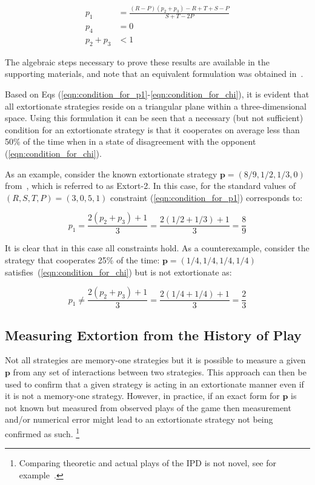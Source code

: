 \documentclass[10pt,letterpaper]{article}
\begin{document}
\begin{align}
    p_1 & = \frac{(R-P)(p_2 + p_3) - R + T + S - P}{S + T - 2P}
     \label{eqn:condition_for_p1}\\
    p_4 & = 0 \label{eqn:condition_for_p4}\\
    p_2 + p_3 & < 1\label{eqn:condition_for_chi}
\end{align}

The algebraic steps necessary to prove these results are available in the
supporting materials, and note that an equivalent formulation was obtained
in~\cite{adami2013evolutionary}.

Based on Eqs (\ref{eqn:condition_for_p1}-\ref{eqn:condition_for_chi}), 
it is evident that all extortionate strategies
reside on a triangular plane within a three-dimensional space.
Using this formulation it can be seen that a necessary (but not sufficient)
condition for an extortionate strategy is that it cooperates on average less
than 50\% of the time when in a state of disagreement with the opponent
(\ref{eqn:condition_for_chi}).

As an example, consider the known extortionate strategy \(\textbf{p}=(8 / 9, 1 / 2, 1 /
3, 0)\) from~\cite{Stewart2012}, which is referred to as Extort-2. In
this case, for the standard values of \((R, S, T, P) = (3, 0, 5, 1)\)
constraint (\ref{eqn:condition_for_p1}) corresponds to:

\begin{equation}
    p_1 = \frac{2(p_2 + p_3) + 1}{3}
        = \frac{2(1 / 2 + 1 / 3) + 1}{3}
        = \frac{8}{9}
\end{equation}

It is clear that in this case all constraints hold. As a counterexample,
consider the strategy that cooperates 25\% of the time: \(\textbf{p}=(1 /4, 1 / 4, 1 / 4,
1 / 4)\) satisfies~(\ref{eqn:condition_for_chi}) but is not extortionate as:

\begin{equation}
    p_1 \ne \frac{2(p_2 + p_3) + 1}{3}
        = \frac{2(1 / 4 + 1 / 4) + 1}{3}
        = \frac{2}{3}
\end{equation}

\subsection*{Measuring Extortion from the History of Play}

Not all strategies are memory-one strategies but it is possible to
measure a given \(\textbf{p}\) from any set of interactions between two strategies.
This approach can then be used to confirm that a given strategy is acting
in an extortionate manner even if it is not a memory-one strategy. However, in
practice, if an exact form for \(\textbf{p}\) is not known but measured from observed
plays of the game then measurement and/or numerical error might lead to an
extortionate strategy not being confirmed as such. \footnote{Comparing theoretic
and actual plays of the IPD is not novel, see for example~\cite{Rand2013}.}
\end{document}
